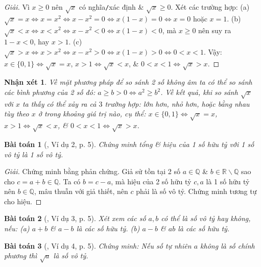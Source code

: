 \documentclass{article}
\newtheorem{baitoan}{Bài toán}
\newtheorem{nhanxet}{Nhận xét}
\begin{document}
\begin{proof}[Giải]
	Vì $x\ge0$ nên $\sqrt{x}$ có nghĩa\texttt{/}xác định \& $\sqrt{x}\ge0$. Xét các trường hợp: (a) $\sqrt{x} = x\Leftrightarrow x = x^2\Leftrightarrow x - x^2 = 0\Leftrightarrow x(1 - x) = 0\Leftrightarrow x = 0$ hoặc $x = 1$. (b) $\sqrt{x} < x\Leftrightarrow x < x^2\Leftrightarrow x - x^2 < 0\Leftrightarrow x(1 - x) < 0$, mà $x\ge0$ nên suy ra $1 - x < 0$, hay $x > 1$. (c) $\sqrt{x} > x\Leftrightarrow x > x^2\Leftrightarrow x - x^2 > 0\Leftrightarrow x(1 - x) > 0\Leftrightarrow 0 < x < 1$. Vậy: $x\in\{0,1\}\Leftrightarrow\sqrt{x} = x$, $x > 1\Leftrightarrow\sqrt{x} < x$, \& $0 < x < 1\Leftrightarrow\sqrt{x} > x$.
\end{proof}

\begin{nhanxet}
	Về mặt phương pháp để so sánh 2 số không âm ta có thể so sánh các bình phương của 2 số đó: $a\ge b > 0\Leftrightarrow a^2\ge b^2$. Về kết quả, khi so sánh $\sqrt{x}$ với $x$ ta thấy có thể xảy ra cả $3$ trường hợp: lớn hơn, nhỏ hơn, hoặc bằng nhau tùy theo $x$ ở trong khoảng giá trị nào, cụ thể: $x\in\{0,1\}\Leftrightarrow\sqrt{x} = x$, $x > 1\Leftrightarrow\sqrt{x} < x$, \& $0 < x < 1\Leftrightarrow\sqrt{x} > x$.
\end{nhanxet}

\begin{baitoan}[\cite{Binh_Toan_9_tap_1}, Ví dụ 2, p. 5]
	Chứng minh tổng \& hiệu của 1 số hữu tỷ với 1 số vô tỷ là 1 số vô tỷ.
\end{baitoan}

\begin{proof}[Giải]
	Chứng minh bằng phản chứng. Giả sử tồn tại 2 số $a\in\mathbb{Q}$ \& $b\in\mathbb{R}\backslash\mathbb{Q}$ sao cho $c = a + b\in\mathbb{Q}$. Ta có $b = c - a$, mà hiệu của 2 số hữu tỷ $c,a$ là 1 số hữu tỷ nên $b\in\mathbb{Q}$, mâu thuẫn với giả thiết, nên $c$ phải là số vô tỷ. Chứng minh tương tự cho hiệu.
\end{proof}

\begin{baitoan}[\cite{Binh_Toan_9_tap_1}, Ví dụ 3, p. 5]
	Xét xem các số $a,b$ có thể là số vô tỷ hay không, nếu: (a) $a + b$ \& $a - b$ là các số hữu tỷ. (b) $a - b$ \& $ab$ là các số hữu tỷ.
\end{baitoan}

\begin{baitoan}[\cite{Binh_Toan_9_tap_1}, Ví dụ 4, p. 5]
	Chứng minh: Nếu số tự nhiên $a$ không là số chính phương thì $\sqrt{a}$ là số vô tỷ.
\end{baitoan}
\end{document}
